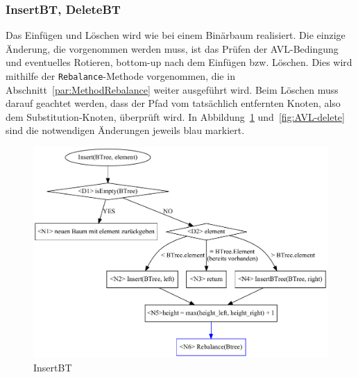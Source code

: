 \subsubsection{InsertBT, DeleteBT}
Das Einfügen und Löschen wird wie bei einem Binärbaum realisiert.
Die einzige Änderung, die vorgenommen werden muss, ist das Prüfen der
AVL-Bedingung und eventuelles Rotieren, bottom-up nach dem Einfügen bzw. Löschen.
Dies wird mithilfe der \verb|Rebalance|-Methode vorgenommen, die in
Abschnitt~\ref{par:MethodRebalance} weiter ausgeführt wird.
Beim Löschen muss darauf geachtet werden, dass der Pfad vom tatsächlich entfernten Knoten, also
dem Substitution-Knoten, überprüft wird.
In Abbildung~\ref{fig:AVL-insert} und~\ref{fig:AVL-delete} sind die notwendigen Änderungen jeweils
blau markiert.

\begin{figure}[htbp]
    \centering
    \includegraphics[scale = 0.35]{img/gv/insert}
    \caption{InsertBT}
    \label{fig:AVL-insert}
\end{figure}
